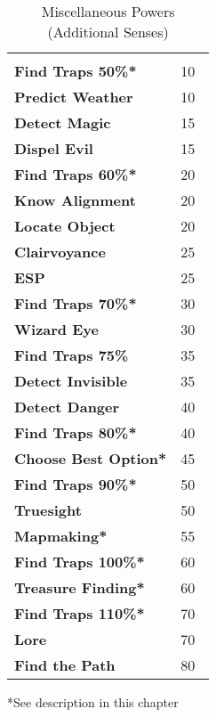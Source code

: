 \begin{multicols*}{2}
\begin {table}[H]
  \caption{Miscellaneous Powers (Additional Senses)}
  \begin{tabularx}{\columnwidth}{>{\bfseries}YY}
   & \\
	Find Traps 50\%* & 10\\
	Predict Weather & 10\\
	Detect Magic & 15\\
	Dispel Evil & 15\\
	Find Traps 60\%* & 20\\
	Know Alignment & 20\\
	Locate Object & 20\\
	Clairvoyance & 25\\
	ESP & 25\\
	Find Traps 70\%* & 30\\
	Wizard Eye & 30\\
	Find Traps 75\% & 35\\
	Detect Invisible & 35\\
	Detect Danger & 40\\
	Find Traps 80\%* & 40\\
	Choose Best Option* & 45\\
	Find Traps 90\%* & 50\\
	Truesight & 50\\
	Mapmaking* & 55\\
	Find Traps 100\%* & 60\\
	Treasure Finding* & 60\\
	Find Traps 110\%* & 70\\
	Lore & 70\\
	Find the Path & 80\
  \end {tabularx}
	*See description in this chapter
\end {table}


\end{multicols*}

